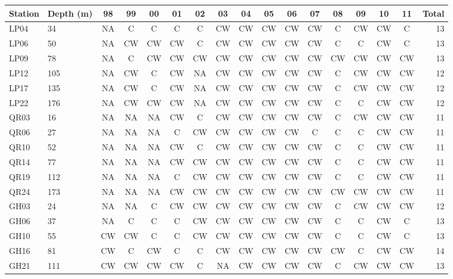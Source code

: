 \documentclass[preprint, authoryear, 12pt]{elsarticle}
\begin{document}
    {\scriptsize
    \begin{longtable}{llccccccccccccccr}
    \label{tab:station_sampling} \\
    \hline
    \hline
         Station & Depth (m) & 98 & 99 & 00 & 01 & 02 & 03 & 04 & 05 & 06 & 07 & 08 & 09 & 10 & 11 & Total   \\
         \hline
        LP04 & 34  & NA & C & C & C & C & CW & CW & CW & CW & CW & C & CW & CW & C & 13 \\
        LP06 & 50  & NA & CW & CW & CW & C & CW & CW & CW & CW & CW & C & C & CW & C & 13 \\
        LP09 & 78  & NA & C & CW & CW & CW & CW & CW & CW & CW & CW & CW & CW & CW & CW & 13 \\
        LP12 & 105 & NA & CW & C & CW & NA & CW & CW & CW & CW & CW & C & CW & CW & CW & 12 \\
        LP17 & 135 & NA & CW & C & CW & NA & CW & CW & CW & CW & CW & C & CW & CW & CW & 12 \\
        LP22 & 176 & NA & CW & CW & CW & NA & CW & CW & CW & CW & CW & C & C & CW & CW & 12 \\
        QR03 & 16  & NA & NA & NA & CW & C & CW & CW & CW & CW & CW & C & CW & CW & CW & 11 \\
        QR06 & 27  & NA & NA & NA & C & CW & CW & CW & CW & CW & C & C & C & CW & CW & 11 \\
        QR10 & 52  & NA & NA & NA & CW & C & CW & CW & CW & CW & CW & C & C & CW & CW & 11 \\
        QR14 & 77 & NA & NA & NA & CW & CW & CW & CW & CW & CW & CW & C & C & CW & CW & 11 \\
        QR19 & 112 & NA & NA & NA & C & CW & CW & CW & CW & CW & CW & C & C & CW & CW & 11 \\
        QR24 & 173 & NA & NA & NA & CW & CW & CW & CW & CW & CW & CW & CW & CW & CW & CW & 11 \\
        GH03 & 24  & NA & NA & C & CW & CW & CW & CW & CW & CW & CW & C & CW & CW & CW & 12 \\
        GH06 & 37  & NA & C & C & C & CW & CW & CW & CW & CW & CW & C & C & CW & C & 13 \\
        GH10 & 55  & CW & CW & C & C & CW & CW & CW & CW & CW & CW & C & C & CW & C & 13 \\
        GH16 & 81 & CW & C & CW & C & C & CW & CW & CW & CW & CW & CW & C & CW & CW & 14 \\
        GH21 & 111 & CW & CW & CW & CW & C & NA & CW & CW & CW & CW & C & CW & CW & CW & 13 \\

\end{longtable}}
\end{document}
